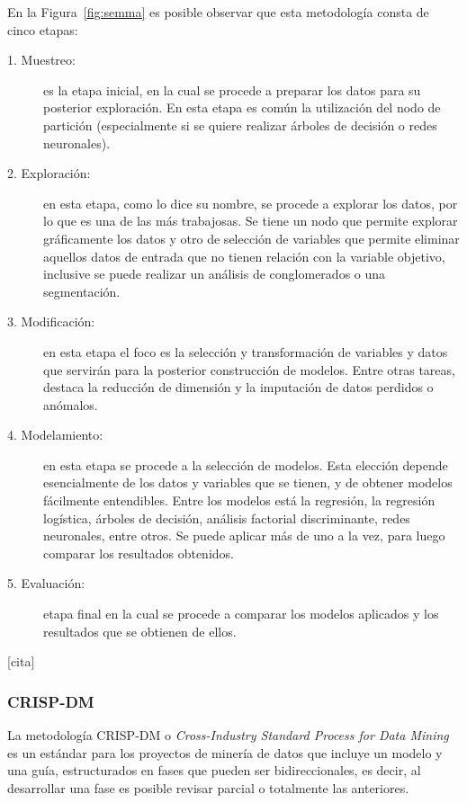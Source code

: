 En la Figura~\ref{fig:semma} es posible observar que esta metodología consta de cinco etapas:
\begin{description}
  \item[1. Muestreo:] es la etapa inicial, en la cual se procede a preparar los datos para su posterior exploración. En esta etapa es común la utilización del nodo de partición (especialmente si se quiere realizar árboles de decisión o redes neuronales). 
  \item[2. Exploración:] en esta etapa, como lo dice su nombre, se procede a explorar los datos, por lo que es una de las más trabajosas. Se tiene un nodo que permite explorar gráficamente los datos y otro de selección de variables que permite eliminar aquellos datos de entrada que no tienen relación con la variable objetivo, inclusive se puede realizar un análisis de conglomerados o una segmentación.
  \item[3. Modificación:] en esta etapa el foco es la selección y transformación de variables y datos que servirán para la posterior construcción de modelos. Entre otras tareas, destaca la reducción de dimensión y la imputación de datos perdidos o anómalos.
  \item[4. Modelamiento:] en esta etapa se procede a la selección de modelos. Esta elección depende esencialmente de los datos y variables que se tienen, y de obtener modelos fácilmente entendibles. Entre los modelos está la regresión, la regresión logística, árboles de decisión, análisis factorial discriminante, redes neuronales, entre otros. Se puede aplicar más de uno a la vez, para luego comparar los resultados obtenidos.
  \item[5. Evaluación:] etapa final en la cual se procede a comparar los modelos aplicados y los resultados que se obtienen de ellos. 
\end{description}
[cita]

\subsubsection{CRISP-DM}
La metodología CRISP-DM o \textit{Cross-Industry Standard Process for Data Mining} es un estándar para los proyectos de minería de datos que incluye un modelo y una guía, estructurados en fases que pueden ser bidireccionales, es decir, al desarrollar una fase es posible revisar parcial o totalmente las anteriores. 


